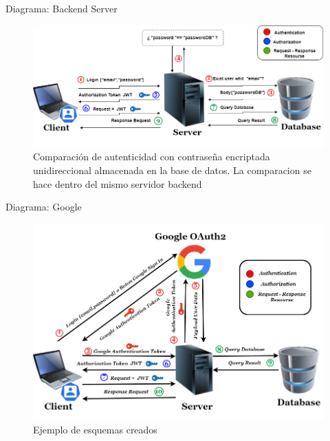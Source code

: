 \documentclass[xcolor=pdftex,dvipsnames,table]{beamer}
\begin{document}
\begin{frame}{Diagrama: Backend Server}
    \begin{figure}[htb]
        \centering
        \captionsetup{justification=centering,margin=0.3cm}
        \includegraphics[width=1\linewidth]{auth/backednserer.png}
        \caption*{\footnotesize  Comparación de autenticidad con contraseña encriptada unidireccional almacenada en la base de datos. La comparacion se hace dentro del mismo servidor backend}
    \end{figure} 
\end{frame}
\begin{frame}{Diagrama: Google}
    \begin{figure}[htb]
        \centering
        \captionsetup{justification=centering,margin=0.3cm}
        \includegraphics[width=1\linewidth]{auth/googleSignIn.png}
        \caption*{\footnotesize  Ejemplo de esquemas creados }
    \end{figure} 
\end{frame}
\end{document}
